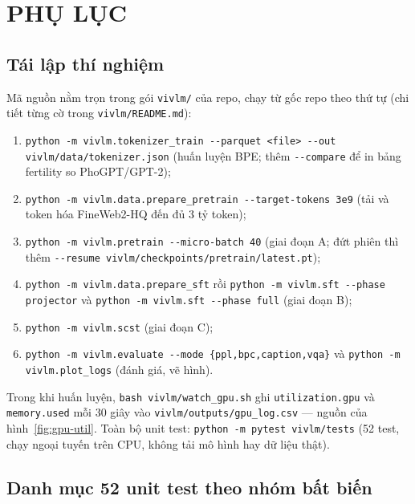 \appendix
\chapter{PHỤ LỤC}
\label{app:appendix}

\section{Tái lập thí nghiệm}
\label{app:repro}

Mã nguồn nằm trọn trong gói \texttt{vivlm/} của repo, chạy từ gốc repo theo
thứ tự (chi tiết từng cờ trong \texttt{vivlm/README.md}):

\begin{enumerate}
	\item \texttt{python -m vivlm.tokenizer\_train -{}-parquet <file> -{}-out vivlm/data/tokenizer.json}
	      (huấn luyện BPE; thêm \texttt{-{}-compare} để in bảng fertility so PhoGPT/GPT-2);
	\item \texttt{python -m vivlm.data.prepare\_pretrain -{}-target-tokens 3e9} (tải và
	      token hóa FineWeb2-HQ đến đủ 3 tỷ token);
	\item \texttt{python -m vivlm.pretrain -{}-micro-batch 40} (giai đoạn A; đứt phiên
	      thì thêm \texttt{-{}-resume vivlm/checkpoints/pretrain/latest.pt});
	\item \texttt{python -m vivlm.data.prepare\_sft} rồi
	      \texttt{python -m vivlm.sft -{}-phase projector} và
	      \texttt{python -m vivlm.sft -{}-phase full} (giai đoạn B);
	\item \texttt{python -m vivlm.scst} (giai đoạn C);
	\item \texttt{python -m vivlm.evaluate -{}-mode \{ppl,bpc,caption,vqa\}} và
	      \texttt{python -m vivlm.plot\_logs} (đánh giá, vẽ hình).
\end{enumerate}

Trong khi huấn luyện, \texttt{bash vivlm/watch\_gpu.sh} ghi
\texttt{utilization.gpu} và \texttt{memory.used} mỗi 30 giây vào
\texttt{vivlm/outputs/gpu\_log.csv} --- nguồn của
hình~\ref{fig:gpu-util}. Toàn bộ unit test:
\texttt{python -m pytest vivlm/tests} (52 test, chạy ngoại tuyến trên CPU,
không tải mô hình hay dữ liệu thật).

\section{Danh mục 52 unit test theo nhóm bất biến}
\label{app:tests}

